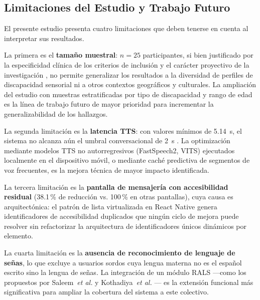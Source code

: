 \documentclass[journal]{IEEEtran}
\begin{document}
		\subsection{Limitaciones del Estudio y Trabajo Futuro}
			El presente estudio presenta cuatro limitaciones que deben tenerse en cuenta al interpretar sus resultados.
			
			La primera es el \textbf{tama\~no muestral}: $n=25$ participantes, si bien justificado por la especificidad cl\'inica de los criterios de inclusi\'on y el car\'acter proyectivo de la investigaci\'on \cite{hernandez2014}, no permite generalizar los resultados a la diversidad de perfiles de discapacidad sensorial ni a otros contextos geogr\'aficos y culturales. La ampliaci\'on del estudio con muestras estratificadas por tipo de discapacidad y rango de edad es la l\'inea de trabajo futuro de mayor prioridad para incrementar la generalizabilidad de los hallazgos.
			
			La segunda limitaci\'on es la \textbf{latencia TTS}: con valores m\'inimos de 5.14~s, el sistema no alcanza a\'un el umbral conversacional de 2~s \cite{tan2021}. La optimizaci\'on mediante modelos TTS no autorregresivos (FastSpeech2, VITS) ejecutados localmente en el dispositivo m\'ovil, o mediante cach\'e predictiva de segmentos de voz frecuentes, es la mejora t\'ecnica de mayor impacto identificada.
			
			La tercera limitaci\'on es la \textbf{pantalla de mensajer\'ia con accesibilidad residual} (38.1\,\% de reducci\'on vs. 100\,\% en otras pantallas), cuya causa es arquitect\'onica: el patr\'on de lista virtualizada en React Native genera identificadores de accesibilidad duplicados que ning\'un ciclo de mejora puede resolver sin refactorizar la arquitectura de identificadores \'unicos din\'amicos por elemento.
			
			La cuarta limitaci\'on es la \textbf{ausencia de reconocimiento de lenguaje de se\~nas}, lo que excluye a usuarios sordos cuya lengua materna no es el espa\~nol escrito sino la lengua de se\~nas. La integraci\'on de un m\'odulo RALS ---como los propuestos por Saleem~\textit{et al.} \cite{saleem2023} y Kothadiya~\textit{et al.} \cite{kothadiya2022}--- es la extensi\'on funcional m\'as significativa para ampliar la cobertura del sistema a este colectivo.
			
\end{document}
